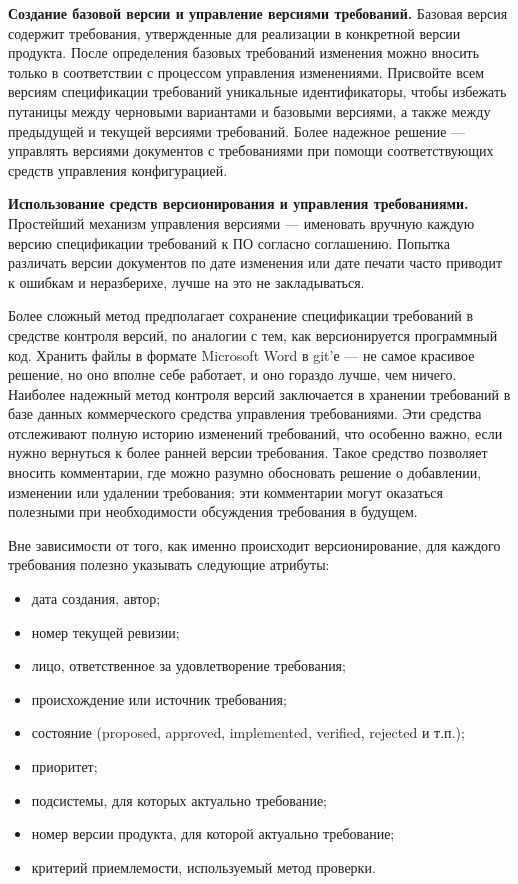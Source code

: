 \documentclass{../../text-style}
\begin{document}
\textbf{Создание базовой версии и управление версиями требований.} Базовая версия содержит требования, утвержденные для реализации в конкретной версии продукта. После определения базовых требований изменения можно вносить только в соответствии с процессом управления изменениями. Присвойте всем версиям спецификации требований уникальные идентификаторы, чтобы избежать путаницы между черновыми вариантами и базовыми версиями, а также между предыдущей и текущей версиями требований. Более надежное решение --- управлять версиями документов с требованиями при помощи соответствующих средств управления конфигурацией.

\textbf{Использование средств версионирования и управления требованиями.} Простейший механизм управления версиями --- именовать вручную каждую версию спецификации требований к ПО согласно соглашению. Попытка различать версии документов по дате изменения или дате печати часто приводит к ошибкам и неразберихе, лучше на это не закладываться.

Более сложный метод предполагает сохранение спецификации требований в средстве контроля версий, по аналогии с тем, как версионируется программный код. Хранить файлы в формате Microsoft Word в git’е --- не самое красивое решение, но оно вполне себе работает, и оно гораздо лучше, чем ничего. Наиболее надежный метод контроля версий заключается в хранении требований в базе данных коммерческого средства управления требованиями. Эти средства отслеживают полную историю изменений требований, что особенно важно, если нужно вернуться к более ранней версии требования. Такое средство позволяет вносить комментарии, где можно разумно обосновать решение о добавлении, изменении или удалении требования; эти комментарии могут оказаться полезными при необходимости обсуждения требования в будущем.

Вне зависимости от того, как именно происходит версионирование, для каждого требования полезно указывать следующие атрибуты:
\begin{itemize}
    \item дата создания, автор;
    \item номер текущей ревизии;
    \item лицо, ответственное за удовлетворение требования;
    \item происхождение или источник требования;
    \item состояние (proposed, approved, implemented, verified, rejected и т.п.);
    \item приоритет;
    \item подсистемы, для которых актуально требование;
    \item номер версии продукта, для которой актуально требование;
    \item критерий приемлемости, используемый метод проверки.
\end{itemize}
\end{document}
